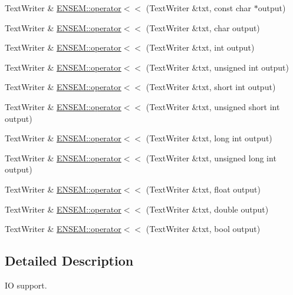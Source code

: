 \begin{DoxyCompactItemize}
\item 
Text\+Writer \& \mbox{\hyperlink{group__io_gaf097695886fb51a3d6c35f6b0bac14fc}{E\+N\+S\+E\+M\+::operator$<$$<$}} (Text\+Writer \&txt, const char $\ast$output)
\item 
Text\+Writer \& \mbox{\hyperlink{group__io_ga1d3217dcbc1fea5b302c0b53833dad39}{E\+N\+S\+E\+M\+::operator$<$$<$}} (Text\+Writer \&txt, char output)
\item 
Text\+Writer \& \mbox{\hyperlink{group__io_ga0dc2ec2539e29f2482b5e033daf6b013}{E\+N\+S\+E\+M\+::operator$<$$<$}} (Text\+Writer \&txt, int output)
\item 
Text\+Writer \& \mbox{\hyperlink{group__io_gafe8260aa83dc65480d323272a62f2ec0}{E\+N\+S\+E\+M\+::operator$<$$<$}} (Text\+Writer \&txt, unsigned int output)
\item 
Text\+Writer \& \mbox{\hyperlink{group__io_gab16e79cd4973872500ffbdacdc04be37}{E\+N\+S\+E\+M\+::operator$<$$<$}} (Text\+Writer \&txt, short int output)
\item 
Text\+Writer \& \mbox{\hyperlink{group__io_ga1d2f1326c7e1471ec11e3290bca05276}{E\+N\+S\+E\+M\+::operator$<$$<$}} (Text\+Writer \&txt, unsigned short int output)
\item 
Text\+Writer \& \mbox{\hyperlink{group__io_ga8d4e5827a00d9bf9fd96b669720052d1}{E\+N\+S\+E\+M\+::operator$<$$<$}} (Text\+Writer \&txt, long int output)
\item 
Text\+Writer \& \mbox{\hyperlink{group__io_gabb890a87f7dab1b0e731aaf8b8c3a681}{E\+N\+S\+E\+M\+::operator$<$$<$}} (Text\+Writer \&txt, unsigned long int output)
\item 
Text\+Writer \& \mbox{\hyperlink{group__io_ga0e07b49d2a54640fc8aa6cdeed40005a}{E\+N\+S\+E\+M\+::operator$<$$<$}} (Text\+Writer \&txt, float output)
\item 
Text\+Writer \& \mbox{\hyperlink{group__io_ga77263e95f4f5d264142cf805ef1fc01f}{E\+N\+S\+E\+M\+::operator$<$$<$}} (Text\+Writer \&txt, double output)
\item 
Text\+Writer \& \mbox{\hyperlink{group__io_ga4bb4e9f2c0da52dbce22280b6b00e35d}{E\+N\+S\+E\+M\+::operator$<$$<$}} (Text\+Writer \&txt, bool output)
\end{DoxyCompactItemize}


\subsection{Detailed Description}
IO support. 

